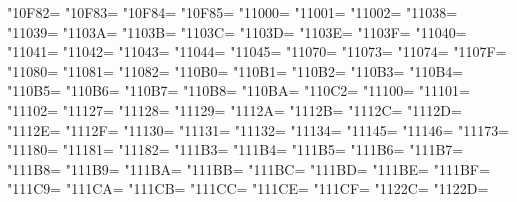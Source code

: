 \XeTeXcharclass"10F82=\KclassCM
\XeTeXcharclass"10F83=\KclassCM
\XeTeXcharclass"10F84=\KclassCM
\XeTeXcharclass"10F85=\KclassCM
\XeTeXcharclass"11000=\KclassCM
\XeTeXcharclass"11001=\KclassCM
\XeTeXcharclass"11002=\KclassCM
\XeTeXcharclass"11038=\KclassCM
\XeTeXcharclass"11039=\KclassCM
\XeTeXcharclass"1103A=\KclassCM
\XeTeXcharclass"1103B=\KclassCM
\XeTeXcharclass"1103C=\KclassCM
\XeTeXcharclass"1103D=\KclassCM
\XeTeXcharclass"1103E=\KclassCM
\XeTeXcharclass"1103F=\KclassCM
\XeTeXcharclass"11040=\KclassCM
\XeTeXcharclass"11041=\KclassCM
\XeTeXcharclass"11042=\KclassCM
\XeTeXcharclass"11043=\KclassCM
\XeTeXcharclass"11044=\KclassCM
\XeTeXcharclass"11045=\KclassCM
\XeTeXcharclass"11070=\KclassCM
\XeTeXcharclass"11073=\KclassCM
\XeTeXcharclass"11074=\KclassCM
\XeTeXcharclass"1107F=\KclassCM
\XeTeXcharclass"11080=\KclassCM
\XeTeXcharclass"11081=\KclassCM
\XeTeXcharclass"11082=\KclassCM
\XeTeXcharclass"110B0=\KclassCM
\XeTeXcharclass"110B1=\KclassCM
\XeTeXcharclass"110B2=\KclassCM
\XeTeXcharclass"110B3=\KclassCM
\XeTeXcharclass"110B4=\KclassCM
\XeTeXcharclass"110B5=\KclassCM
\XeTeXcharclass"110B6=\KclassCM
\XeTeXcharclass"110B7=\KclassCM
\XeTeXcharclass"110B8=\KclassCM
\XeTeXcharclass"110BA=\KclassCM
\XeTeXcharclass"110C2=\KclassCM
\XeTeXcharclass"11100=\KclassCM
\XeTeXcharclass"11101=\KclassCM
\XeTeXcharclass"11102=\KclassCM
\XeTeXcharclass"11127=\KclassCM
\XeTeXcharclass"11128=\KclassCM
\XeTeXcharclass"11129=\KclassCM
\XeTeXcharclass"1112A=\KclassCM
\XeTeXcharclass"1112B=\KclassCM
\XeTeXcharclass"1112C=\KclassCM
\XeTeXcharclass"1112D=\KclassCM
\XeTeXcharclass"1112E=\KclassCM
\XeTeXcharclass"1112F=\KclassCM
\XeTeXcharclass"11130=\KclassCM
\XeTeXcharclass"11131=\KclassCM
\XeTeXcharclass"11132=\KclassCM
\XeTeXcharclass"11134=\KclassCM
\XeTeXcharclass"11145=\KclassCM
\XeTeXcharclass"11146=\KclassCM
\XeTeXcharclass"11173=\KclassCM
\XeTeXcharclass"11180=\KclassCM
\XeTeXcharclass"11181=\KclassCM
\XeTeXcharclass"11182=\KclassCM
\XeTeXcharclass"111B3=\KclassCM
\XeTeXcharclass"111B4=\KclassCM
\XeTeXcharclass"111B5=\KclassCM
\XeTeXcharclass"111B6=\KclassCM
\XeTeXcharclass"111B7=\KclassCM
\XeTeXcharclass"111B8=\KclassCM
\XeTeXcharclass"111B9=\KclassCM
\XeTeXcharclass"111BA=\KclassCM
\XeTeXcharclass"111BB=\KclassCM
\XeTeXcharclass"111BC=\KclassCM
\XeTeXcharclass"111BD=\KclassCM
\XeTeXcharclass"111BE=\KclassCM
\XeTeXcharclass"111BF=\KclassCM
\XeTeXcharclass"111C9=\KclassCM
\XeTeXcharclass"111CA=\KclassCM
\XeTeXcharclass"111CB=\KclassCM
\XeTeXcharclass"111CC=\KclassCM
\XeTeXcharclass"111CE=\KclassCM
\XeTeXcharclass"111CF=\KclassCM
\XeTeXcharclass"1122C=\KclassCM
\XeTeXcharclass"1122D=\KclassCM
